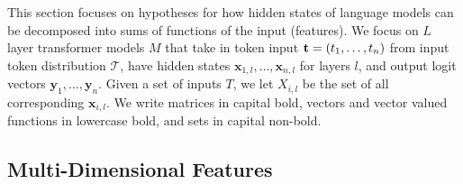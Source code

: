 \documentclass{article} %
\DeclareRobustCommand{\revOne}[1]{#1}
\theoremstyle{plain}
\theoremstyle{definition}
\newtheorem{definition}{Definition}
\newcommand{\josh}[1]{{\color{orange}{\bf Josh:} #1}}
\newcommand{\maxx}[1]{{\color{blue}{\bf Max:} #1}}
\begin{document}


\def\a{{\mathbf a}}
\def\b{{\mathbf b}}
\def\c{{\mathbf c}}
\def\f{{\mathbf f}}
\def\g{{\mathbf g}}
\def\A{{\mathbf A}}
\def\B{{\mathbf B}}
\def\D{{\mathbf D}}
\def\P{{\mathbf P}}
\def\E{{\mathbf E}}
\def\M{{\mathbf R}}
\def\uu{\mathbf{u}}
\def\W{{\mathbf W}}
\def\x{\mathbf{x}}
\def\z{\mathbf{z}}
\def\y{\mathbf{y}}
\def\xl#1{\x_{#1,l}}
\def\justvv{\mathbf{v}}
\def\vv#1{\mathbf{v}_{#1}}
\def\V{\mathbf{V}}
\def\p{\mathbf{p}}


This section focuses on hypotheses for how hidden states of language models can be decomposed into sums of functions of the input (features). We focus on $L$ layer transformer models $M$ that take in token input ${\bf t} = (t_1, \ldots, t_n)$ \revOne{from input token distribution $\mathcal{T}$}, have hidden states $\xl{1}, \ldots, \xl{n}$ for layers $l$, and output logit vectors $\y_1, \ldots, \y_n$. Given a set of inputs $T$, we let $X_{i, l}$ be the set of all corresponding $\x_{i, l}$.  
We write matrices in capital bold, vectors and vector valued functions in lowercase bold, and sets in capital non-bold.



\subsection{Multi-Dimensional Features}



\end{document}
